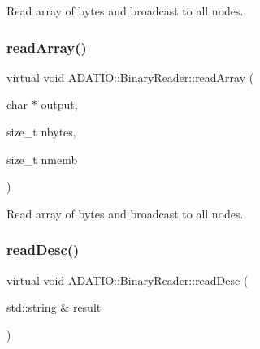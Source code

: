 Read array of bytes and broadcast to all nodes. 

\mbox{\label{classADATIO_1_1BinaryReader_aba9bb1d3a6af4b6ab28388f6bd003d91}} 
\subsubsection{\texorpdfstring{readArray()}{readArray()}\hspace{0.1cm}{\footnotesize\ttfamily [3/3]}}
{\footnotesize\ttfamily virtual void A\+D\+A\+T\+I\+O\+::\+Binary\+Reader\+::read\+Array (\begin{DoxyParamCaption}\item[{char $\ast$}]{output,  }\item[{size\+\_\+t}]{nbytes,  }\item[{size\+\_\+t}]{nmemb }\end{DoxyParamCaption})\hspace{0.3cm}{\ttfamily [virtual]}}



Read array of bytes and broadcast to all nodes. 

\mbox{\label{classADATIO_1_1BinaryReader_a70de2f31f59d9846f4ee688c3590bf31}} 
\subsubsection{\texorpdfstring{readDesc()}{readDesc()}\hspace{0.1cm}{\footnotesize\ttfamily [1/3]}}
{\footnotesize\ttfamily virtual void A\+D\+A\+T\+I\+O\+::\+Binary\+Reader\+::read\+Desc (\begin{DoxyParamCaption}\item[{std\+::string \&}]{result }\end{DoxyParamCaption})\hspace{0.3cm}{\ttfamily [virtual]}}

